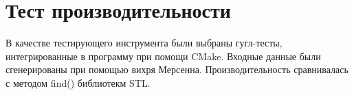 \section{Тест производительности}

В качестве тестирующего инструмента были выбраны гугл-тесты, интегрированные в программу при помощи CMake. Входные данные были сгенерированы при помощью вихря Мерсенна. Производительность сравнивалась с методом find() библиотекм STL.

\pagebreak


